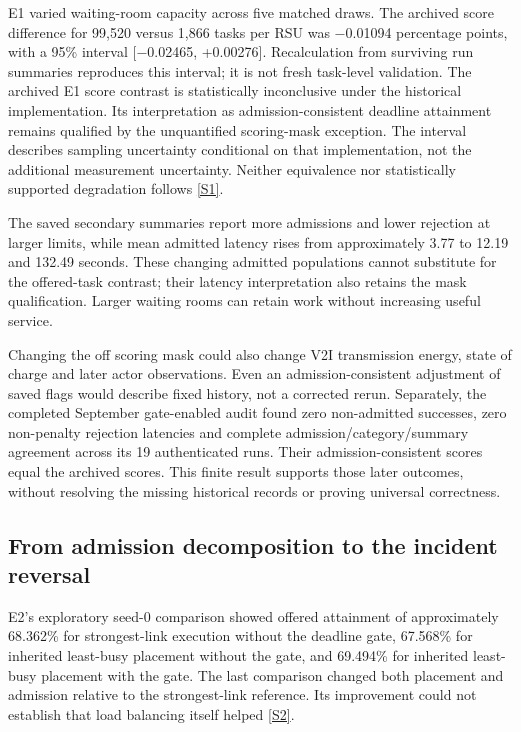 \documentclass[11pt,a4paper]{article}
\begin{document}
E1 varied waiting-room capacity across five matched draws. The archived score difference for 99,520 versus 1,866 tasks per RSU was \ensuremath{-}0.01094 percentage points, with a 95\% interval [\ensuremath{-}0.02465, +0.00276]. Recalculation from surviving run summaries reproduces this interval; it is not fresh task-level validation. The archived E1 score contrast is statistically inconclusive under the historical implementation. Its interpretation as admission-consistent deadline attainment remains qualified by the unquantified scoring-mask exception. The interval describes sampling uncertainty conditional on that implementation, not the additional measurement uncertainty. Neither equivalence nor statistically supported degradation follows \hyperref[source-s1]{[S1]}.

The saved secondary summaries report more admissions and lower rejection at larger limits, while mean admitted latency rises from approximately 3.77 to 12.19 and 132.49 seconds. These changing admitted populations cannot substitute for the offered-task contrast; their latency interpretation also retains the mask qualification. Larger waiting rooms can retain work without increasing useful service.

Changing the off scoring mask could also change V2I transmission energy, state of charge and later actor observations. Even an admission-consistent adjustment of saved flags would describe fixed history, not a corrected rerun. Separately, the completed September gate-enabled audit found zero non-admitted successes, zero non-penalty rejection latencies and complete admission/category/summary agreement across its 19 authenticated runs. Their admission-consistent scores equal the archived scores. This finite result supports those later outcomes, without resolving the missing historical records or proving universal correctness.

\subsection{From admission decomposition to the incident reversal}\label{sec:3.2}

E2's exploratory seed-0 comparison showed offered attainment of approximately 68.362\% for strongest-link execution without the deadline gate, 67.568\% for inherited least-busy placement without the gate, and 69.494\% for inherited least-busy placement with the gate. The last comparison changed both placement and admission relative to the strongest-link reference. Its improvement could not establish that load balancing itself helped \hyperref[source-s2]{[S2]}.
\end{document}
